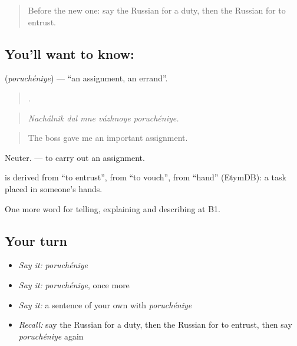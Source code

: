 \label{lesson:RU-C359-poruchenie}



\begin{quote}
Before the new one: say the Russian for a duty, then the Russian for to entrust.
\end{quote}

\subsection*{You'll want to know: }
\textbf{} (\emph{poruchéniye}) — \textquotedblleft{}an assignment, an errand\textquotedblright{}.

\begin{quote}
    .
\end{quote}

\begin{quote}
\emph{Nachálnik dal mne vázhnoye poruchéniye.}
\end{quote}

\begin{quote}
The boss gave me an important assignment.
\end{quote}

Neuter. \emph{ } — to carry out an assignment.

\begin{cousinweb}
\textbf{} is derived from \emph{} \textquotedblleft{}to entrust\textquotedblright{}, from \emph{} \textquotedblleft{}to vouch\textquotedblright{}, from \emph{} \textquotedblleft{}hand\textquotedblright{} (EtymDB): a task placed in someone’s hands.
\end{cousinweb}

\begin{grammarlens}[title={What you've built}]
One more word for telling, explaining and describing at B1.
\end{grammarlens}

\subsection*{Your turn}
\begin{itemize}
\raggedright
  \item \emph{Say it:} \emph{poruchéniye}
  \item \emph{Say it:} \emph{poruchéniye}, once more
  \item \emph{Say it:} a sentence of your own with \emph{poruchéniye}
  \item \emph{Recall:} say the Russian for a duty, then the Russian for to entrust, then say \emph{poruchéniye} again
\end{itemize}

